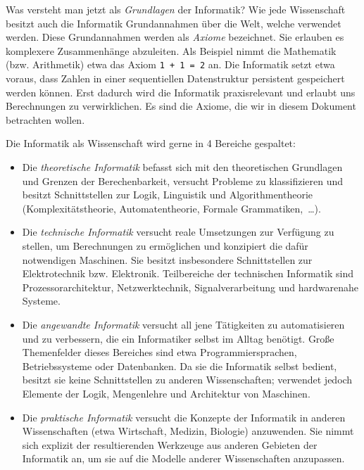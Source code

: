 Was versteht man jetzt als \emph{Grundlagen} der Informatik? Wie jede
Wissenschaft besitzt auch die Informatik Grundannahmen über die Welt,
welche verwendet werden. Diese Grundannahmen werden als \emph{Axiome} bezeichnet.
Sie erlauben es komplexere Zusammenhänge abzuleiten. Als Beispiel nimmt
die Mathematik (bzw. Arithmetik) etwa das Axiom \verb!1 + 1 = 2! an.
Die Informatik setzt etwa voraus, dass Zahlen in einer sequentiellen
Datenstruktur persistent gespeichert werden können. Erst dadurch wird die
Informatik praxisrelevant und erlaubt uns Berechnungen zu verwirklichen.
Es sind die Axiome, die wir in diesem Dokument betrachten wollen.

Die Informatik als Wissenschaft wird gerne in 4 Bereiche gespaltet:
\begin{itemize}
 \item Die \emph{theoretische Informatik} befasst sich mit
        den theoretischen Grundlagen und Grenzen der Berechenbarkeit,
        versucht Probleme zu klassifizieren und besitzt Schnittstellen
        zur Logik, Linguistik und Algorithmentheorie
        (Komplexitätstheorie, Automatentheorie, Formale Grammatiken,~\dots).
 \item Die \emph{technische Informatik} versucht
        reale Umsetzungen zur Verfügung zu stellen, um Berechnungen
        zu ermöglichen und konzipiert die dafür notwendigen Maschinen.
        Sie besitzt insbesondere Schnittstellen zur Elektrotechnik bzw.
        Elektronik. Teilbereiche der technischen Informatik sind
        Prozessorarchitektur, Netzwerktechnik, Signalverarbeitung und
        hardwarenahe Systeme.
 \item Die \emph{angewandte Informatik} versucht all jene Tätigkeiten
        zu automatisieren und zu verbessern, die ein Informatiker
        selbst im Alltag benötigt. Große Themenfelder dieses Bereiches sind
        etwa Programmiersprachen, Betriebssysteme oder Datenbanken. Da
        sie die Informatik selbst bedient, besitzt sie keine
        Schnittstellen zu anderen Wissenschaften; verwendet jedoch
        Elemente der Logik, Mengenlehre und Architektur von Maschinen.
  \item Die \emph{praktische Informatik} versucht die Konzepte der
        Informatik in anderen Wissenschaften (etwa Wirtschaft, Medizin,
        Biologie) anzuwenden. Sie nimmt sich explizit der resultierenden
        Werkzeuge aus anderen Gebieten der Informatik an, um sie auf
        die Modelle anderer Wissenschaften anzupassen.
\end{itemize}

